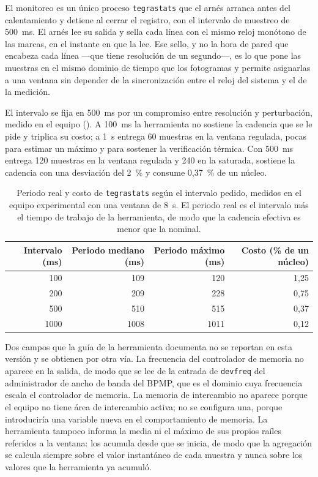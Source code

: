 El monitoreo es un único proceso \texttt{tegrastats} que el arnés arranca
antes del calentamiento y detiene al cerrar el registro, con el intervalo de
muestreo de 500~ms. El arnés lee su salida y sella cada línea con el mismo
reloj monótono de las marcas, en el instante en que la lee. Ese sello, y no la
hora de pared que encabeza cada línea ---que tiene resolución de un
segundo---, es lo que pone las muestras en el mismo dominio de tiempo que los
fotogramas y permite asignarlas a una ventana sin depender de la
sincronización entre el reloj del sistema y el de la medición.

El intervalo se fija en 500~ms por un compromiso entre resolución y
perturbación, medido en el equipo (). A 100~ms la
herramienta no sostiene la cadencia que se le pide y triplica su costo; a
1~s entrega 60 muestras en la ventana regulada, pocas para estimar un máximo y
para sostener la verificación térmica. Con 500~ms entrega 120 muestras en la
ventana regulada y 240 en la saturada, sostiene la cadencia con una
desviación del 2~\% y consume 0,37~\% de un núcleo.

\begin{table}[htbp]
  \centering
  \caption[Periodo real y costo de \texttt{tegrastats}]{Periodo real y costo
  de \texttt{tegrastats} según el intervalo pedido, medidos en el equipo
  experimental con una ventana de 8~s. El periodo real es el intervalo más el
  tiempo de trabajo de la herramienta, de modo que la cadencia efectiva es
  menor que la nominal.}
  \label{tab:sampling-interval}
  \begin{tabular}{@{}rrrr@{}}
    \toprule
    \textbf{Intervalo (ms)} & \textbf{Periodo mediano (ms)} &
    \textbf{Periodo máximo (ms)} & \textbf{Costo (\% de un núcleo)} \\
    \midrule
    100 & 109 & 120 & 1,25 \\
    200 & 209 & 228 & 0,75 \\
    500 & 510 & 515 & 0,37 \\
    1000 & 1008 & 1011 & 0,12 \\
    \bottomrule
  \end{tabular}
\end{table}

Dos campos que la guía de la herramienta documenta no se reportan en esta
versión y se obtienen por otra vía. La frecuencia del controlador de memoria
no aparece en la salida, de modo que se lee de la entrada de
\texttt{devfreq} del administrador de ancho de banda del BPMP, que es el
dominio cuya frecuencia escala el controlador de memoria. La memoria de intercambio no
aparece porque el equipo no tiene área de intercambio activa; no se configura
una, porque introduciría una variable nueva en el comportamiento de memoria.
La herramienta tampoco informa la media ni el máximo de sus propios raíles
referidos a la ventana: los acumula desde que se inicia, de modo que la
agregación se calcula siempre sobre el valor instantáneo de cada muestra y
nunca sobre los valores que la herramienta ya acumuló.

